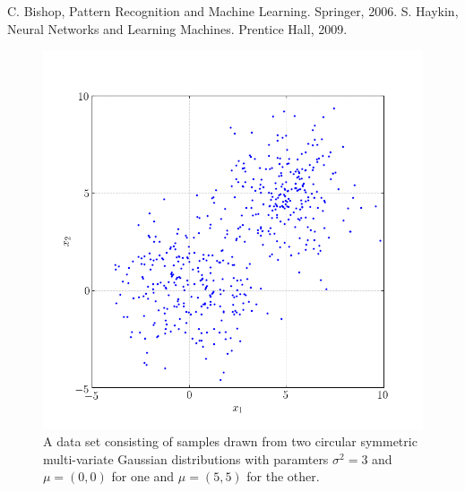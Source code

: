 \documentclass[conference]{IEEEtran}
\begin{document}
\begin{thebibliography}{00}
 C. Bishop, Pattern Recognition and Machine Learning. Springer, 2006.
 S. Haykin, Neural Networks and Learning Machines. Prentice Hall, 2009.
\end{thebibliography}

\begin{figure}[p!]
\centerline{\includegraphics[trim=0 0 0 0, clip, width=\columnwidth]{Figure_1.png}}
\caption{A data set consisting of samples drawn from two circular symmetric multi-variate Gaussian distributions with paramters $\sigma^2=3$ and $\mu=(0,0)$ for one and $\mu=(5,5)$ for the other.}
\label{fig:circgauss}
\end{figure}
\end{document}
